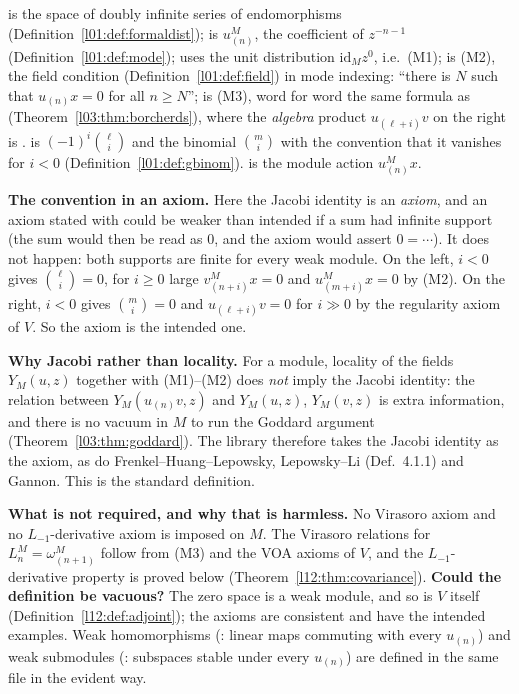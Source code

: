 \begin{dictionary}
 is the space  of doubly infinite series of endomorphisms
(Definition~\ref{l01:def:formaldist});  is $u^M_{(n)}$, the coefficient of $z^{-n-1}$
(Definition~\ref{l01:def:mode});  uses the unit distribution $\mathrm{id}_Mz^0$, i.e.\ (M1);
 is (M2), the field condition (Definition~\ref{l01:def:field}) in mode indexing: ``there is $N$
such that $u_{(n)}x = 0$ for all $n\ge N$'';  is (M3), word for word the same formula as
 (Theorem~\ref{l03:thm:borcherds}), where the \emph{algebra} product
$u_{(\ell+i)}v$ on the right is .  is $(-1)^i\binom\ell i$ and
 the binomial $\binom mi$ with the convention that it vanishes for $i<0$ (Definition~\ref{l01:def:gbinom}).
 is the module action $u^M_{(n)}x$.

\textbf{The  convention in an axiom.} Here the Jacobi identity is an \emph{axiom}, and an axiom stated with
 could be weaker than intended if a sum had infinite support (the sum would then be read as $0$, and the axiom
would assert $0=\cdots$). It does not happen: both supports are finite for every weak module. On the left, $i<0$ gives
$\binom\ell i = 0$, for $i\ge0$ large $v^M_{(n+i)}x = 0$ and $u^M_{(m+i)}x = 0$ by (M2). On the right, $i<0$ gives
$\binom mi=0$ and $u_{(\ell+i)}v = 0$ for $i\gg0$ by the regularity axiom of $V$. So the axiom is the intended one.

\textbf{Why Jacobi rather than locality.} For a module, locality of the fields $Y_M(u,z)$ together with (M1)--(M2) does
\emph{not} imply the Jacobi identity: the relation between $Y_M(u_{(n)}v,z)$ and $Y_M(u,z)$, $Y_M(v,z)$ is extra
information, and there is no vacuum in $M$ to run the Goddard argument (Theorem~\ref{l03:thm:goddard}). The library
therefore takes the Jacobi identity as the axiom, as do Frenkel--Huang--Lepowsky, Lepowsky--Li (Def.~4.1.1) and Gannon.
This is the standard definition.

\textbf{What is not required, and why that is harmless.} No Virasoro axiom and no $L_{-1}$-derivative axiom is imposed on
$M$. The Virasoro relations for $L^M_n = \omega^M_{(n+1)}$ follow from (M3) and the VOA axioms of $V$, and the
$L_{-1}$-derivative property is proved below (Theorem~\ref{l12:thm:covariance}). \textbf{Could the definition be
vacuous?} The zero space is a weak module, and so is $V$ itself (Definition~\ref{l12:def:adjoint}); the axioms are
consistent and have the intended examples. Weak homomorphisms (: linear maps commuting with every
$u_{(n)}$) and weak submodules (: subspaces stable under every $u_{(n)}$) are defined in the
same file in the evident way.
\end{dictionary}

